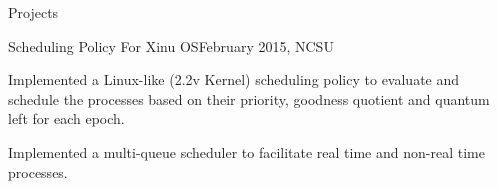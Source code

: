 \documentclass{resume} %
\begin{document}
\begin{rSection}{Projects}
    \begin{rSubsectionProject}{Scheduling Policy For Xinu OS}{February 2015, NCSU}
    	\item Implemented a Linux-like (2.2v Kernel) scheduling policy to evaluate and schedule the processes  based on their priority, goodness quotient and quantum left for each epoch.
        \item Implemented a multi-queue scheduler to facilitate real time and non-real time processes. 
    \end{rSubsectionProject}
    
    \begin{comment} %
        \begin{rSubsectionProject}{Key Recovery For 802.11 Wireless Equivalent Privacy(WEP) Protocol}{November 2014, NCSU}
        	\item Literature review of attack on the WEP link-layer security protocol.
        	\item Implemented a C program to recover WEP's shared key, based on the partial key exposure in RC-4 Stream cipher discovered by Fluhrer, Mantin, and Shamir.
        \end{rSubsectionProject}
    \end{comment}
    
    \begin{comment} %
        \begin{rSubsectionProject}{Code Optimization Using SIMD architecture}{October 2014, NCSU}
        	\item Optimized the alpha blending and gravity simulation program by taking advantage of the Beaglebone's SIMD \\architecture running Debian OS.
        \end{rSubsectionProject}
    \end{comment}
    
    \begin{comment} %
        \begin{rSubsectionProject}{Point-To-Multipoint File Transfer Protocol}{October 2014, NCSU}
        	\item Implemented a sophisticated and reliable point-to-multipoint file transfer protocol over UDP as against the point-to-point transfer limitation of FTP, given the utilization of TCP for reliable data transfer between the endpoints. 
            \item A stop-and-wait ARQ scheme was implemented at the application layer to provide reliability.
        \end{rSubsectionProject}
    \end{comment}


\end{rSection}
\end{document}
